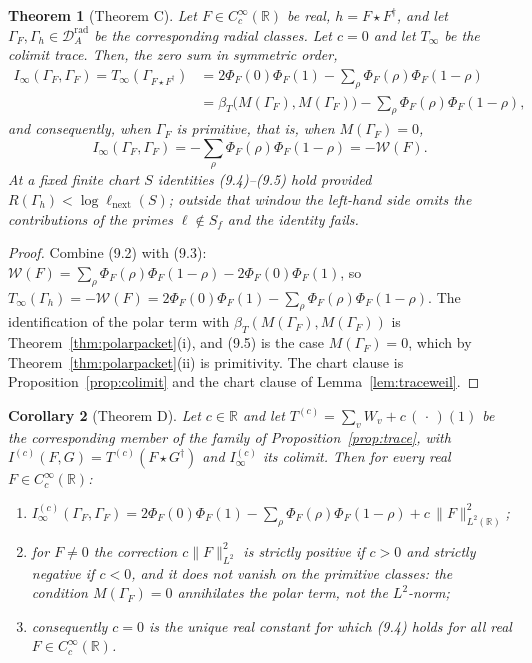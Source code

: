 \documentclass[11pt]{amsart}
\newtheorem{theorem}{Theorem}[section]
\newtheorem{corollary}[theorem]{Corollary}
\theoremstyle{definition}
\theoremstyle{remark}
\newcommand{\R}{\mathbb R}
\newcommand{\DAr}{\mathcal D_A^{\mathrm{rad}}}
\begin{document}
\begin{theorem}[Theorem C]
\label{thm:comparison}
Let $F\in C_c^\infty(\R)$ be real, $h=F\star F^\dagger$, and let
$\Gamma_F,\Gamma_h\in\DAr$ be the corresponding radial classes.  Let $c=0$ and
let $T_\infty$ be the colimit trace.  Then, the zero sum in symmetric order,
\begin{equation}
\begin{aligned}
  I_\infty(\Gamma_F,\Gamma_F)=T_\infty(\Gamma_{F\star F^\dagger})
  &=2\Phi_F(0)\Phi_F(1)-\sum_\rho\Phi_F(\rho)\Phi_F(1-\rho)\\
  &=\beta_T\bigl(M(\Gamma_F),M(\Gamma_F)\bigr)
     -\sum_\rho\Phi_F(\rho)\Phi_F(1-\rho),
\end{aligned}
\tag{9.4}
\end{equation}
and consequently, when $\Gamma_F$ is primitive, that is, when $M(\Gamma_F)=0$,
\begin{equation}
  I_\infty(\Gamma_F,\Gamma_F)=-\sum_\rho\Phi_F(\rho)\Phi_F(1-\rho)
  =-\mathcal W(F).
\tag{9.5}
\end{equation}
At a fixed finite chart $S$ identities \emph{(9.4)}--\emph{(9.5)} hold
provided $R(\Gamma_h)<\log\ell_{\mathrm{next}}(S)$; outside that window the
left-hand side omits the contributions of the primes $\ell\notin S_f$ and the
identity fails.
\end{theorem}

\begin{proof}
Combine (9.2) with (9.3): $\mathcal W(F)=\sum_\rho\Phi_F(\rho)\Phi_F(1-\rho)
-2\Phi_F(0)\Phi_F(1)$, so
$T_\infty(\Gamma_h)=-\mathcal W(F)=2\Phi_F(0)\Phi_F(1)
-\sum_\rho\Phi_F(\rho)\Phi_F(1-\rho)$.  The identification of the polar term
with $\beta_T(M(\Gamma_F),M(\Gamma_F))$ is Theorem~\ref{thm:polarpacket}(i),
and (9.5) is the case $M(\Gamma_F)=0$, which by
Theorem~\ref{thm:polarpacket}(ii) is primitivity.  The chart clause is
Proposition~\ref{prop:colimit} and the chart clause of
Lemma~\ref{lem:traceweil}.
\end{proof}

\begin{corollary}[Theorem D]
\label{cor:c-unique}
Let $c\in\R$ and let $T^{(c)}=\sum_vW_v+c\,(\,\cdot\,)(1)$ be the corresponding
member of the family of Proposition~\emph{\ref{prop:trace}}, with
$I^{(c)}(F,G)=T^{(c)}(F\star G^\dagger)$ and $I_\infty^{(c)}$ its colimit.
Then for every real $F\in C_c^\infty(\R)$:
\begin{enumerate}
\item[(i)] $\displaystyle I_\infty^{(c)}(\Gamma_F,\Gamma_F)
   =2\Phi_F(0)\Phi_F(1)-\sum_\rho\Phi_F(\rho)\Phi_F(1-\rho)
   +c\,\|F\|_{L^2(\R)}^2$;
\item[(ii)] for $F\ne0$ the correction $c\|F\|_{L^2}^2$ is strictly positive if
$c>0$ and strictly negative if $c<0$, and it does \emph{not} vanish on the
primitive classes: the condition $M(\Gamma_F)=0$ annihilates the polar term,
not the $L^2$-norm;
\item[(iii)] consequently $c=0$ is the unique real constant for which
\emph{(9.4)} holds for all real $F\in C_c^\infty(\R)$.
\end{enumerate}
\end{corollary}
\end{document}
